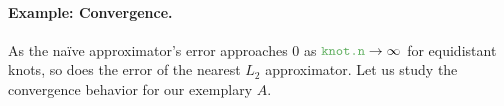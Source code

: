 \documentclass[11pt]{article}\usepackage[]{graphicx}\usepackage[]{color}
\newcommand{\hlkwc}[1]{\textcolor[rgb]{0.333,0.667,0.333}{#1}}%
\newcommand{\argument}[1]{\texttt{\hlkwc{#1}}}
\begin{document}
%
%
%
%
%
%


\paragraph{Example: Convergence.}
As the na\"{i}ve approximator's error approaches 0 as $\text{\argument{knot.n}}\to \infty$
for equidistant knots, so does the error of the nearest $L_2$ approximator.
Let us study the convergence behavior for our exemplary $A$.
\end{document}
